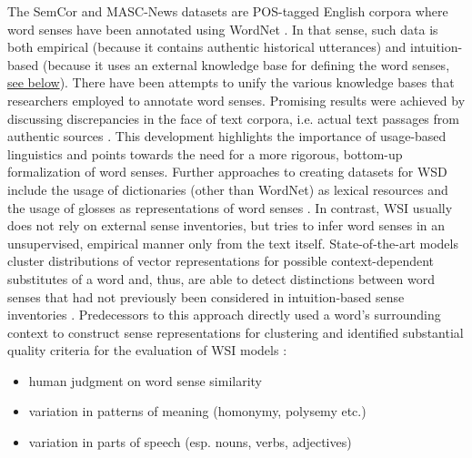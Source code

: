 \documentclass[oneside]{book}
\begin{document}
The SemCor \parencite{mihalceaSemCorCorpus2008} and MASC-News \parencite[4218]{moroAnnotatingMASCCorpus2014} datasets are \gls{POS}-tagged English corpora where word senses have been annotated using WordNet \parencite{tengiDesignImplementationWordNet1998}. In that sense, such data is both empirical (because it contains authentic historical utterances) and intuition-based (because it uses an external knowledge base for defining the word senses, \hyperref[WordNet]{see below}). There have been attempts to unify \parencite[216]{navigliBabelNetBuildingVery2010} the various knowledge bases that researchers employed to annotate word senses. Promising results were achieved by discussing discrepancies in the face of text corpora, i.e. actual text passages from authentic sources \parencite[127]{bakerWordNetFrameNetComplementary2009}. This development highlights the importance of usage-based linguistics and points towards the need for a more rigorous, bottom-up formalization of word senses. Further approaches to creating datasets for \gls{WSD} include the usage of dictionaries (other than WordNet) as lexical resources \parencites[25]{mihalceaSenseval3EnglishLexical2004}[2]{jimeno-yepesExploitingMeSHIndexing2011}[6]{yuanSemisupervisedWordSense2016} and the usage of glosses as representations of word senses \parencite[8]{luoIncorporatingGlossesNeural2018}. In contrast, \gls{WSI} usually does not rely on external sense inventories, but tries to infer word senses in an unsupervised, empirical manner only from the text itself. State-of-the-art models cluster distributions of vector representations for possible context-dependent substitutes of a word and, thus, are able to detect distinctions between word senses that had not previously been considered in intuition-based sense inventories \parencite[1-4]{amramiBetterSubstitutionbasedWord2019}. Predecessors to this approach directly used a word's surrounding context to construct sense representations for clustering and identified substantial quality criteria for the evaluation of \gls{WSI} models \parencite[876-878]{huangImprovingWordRepresentations2012}:
\begin{itemize}
	\item human judgment on word sense similarity
	\item variation in patterns of meaning (homonymy, polysemy etc.)
	\item variation in parts of speech (esp. nouns, verbs, adjectives)
\end{itemize}
\end{document}
